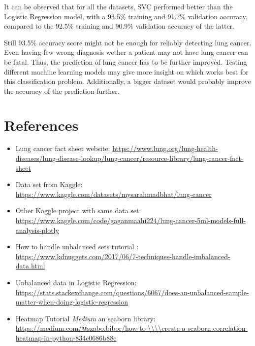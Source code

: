 \documentclass[a4paper,12pt]{article}
\begin{document}
It can be observed that for all the datasets, SVC performed better than the Logistic Regression model, with a 93.5\% training and 91.7\% validation accuracy, compared to the 92.5\% training and 90.9\% validation accuracy of the latter.

Still 93.5\% accuracy score might not be enough for reliably detecting lung cancer.
Even having few wrong diagnosis wether a patient may not have lung cancer can be fatal. Thus, the prediction of lung cancer has to be further improved.
Testing different machine learning models may give more insight on which works best for this classification problem.
Additionally, a bigger dataset would probably improve the accuracy of the prediction further.
















\section{References}
\label{sec:orga429cbf}
\begin{itemize}
\item\relax [1] Lung cancer fact sheet website:  \url{https://www.lung.org/lung-health-diseases/lung-disease-lookup/lung-cancer/resource-library/lung-cancer-fact-sheet}

\item\relax [2] Data set from Kaggle: \url{https://www.kaggle.com/datasets/mysarahmadbhat/lung-cancer}

\item\relax [3] Other Kaggle project with same data set: \url{https://www.kaggle.com/code/gaganmaahi224/lung-cancer-5ml-models-full-analysis-plotly}
\item\relax [4] How to handle unbalanced sets tutorial :
\url{https://www.kdnuggets.com/2017/06/7-techniques-handle-imbalanced-data.html}

\item\relax [5] Unbalanced data in Logistic Regression: \url{https://stats.stackexchange.com/questions/6067/does-an-unbalanced-sample-matter-when-doing-logistic-regression}

\item\relax [6] Heatmap Tutorial \emph{Medium} an seaborn library: \url{https://medium.com/@szabo.bibor/how-to-\\\\create-a-seaborn-correlation-heatmap-in-python-834c0686b88e}
\end{itemize}
\end{document}
